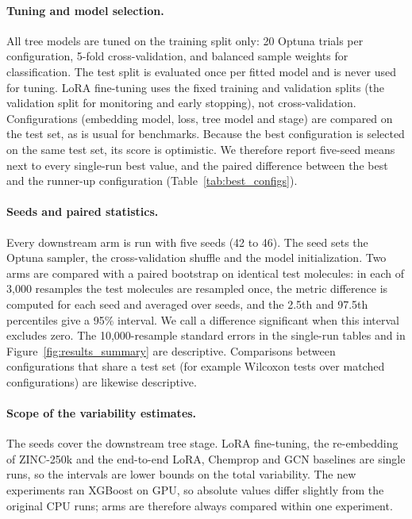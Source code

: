 \documentclass[pdflatex,sn-basic]{sn-jnl}%
\begin{document}
\paragraph{Tuning and model selection.} All tree models are tuned on the training split only: 20 Optuna trials per configuration, 5-fold cross-validation, and balanced sample weights for classification. The test split is evaluated once per fitted model and is never used for tuning. LoRA fine-tuning uses the fixed training and validation splits (the validation split for monitoring and early stopping), not cross-validation. Configurations (embedding model, loss, tree model and stage) are compared on the test set, as is usual for benchmarks. Because the best configuration is selected on the same test set, its score is optimistic. We therefore report five-seed means next to every single-run best value, and the paired difference between the best and the runner-up configuration (Table~\ref{tab:best_configs}).

\paragraph{Seeds and paired statistics.} Every downstream arm is run with five seeds (42 to 46). The seed sets the Optuna sampler, the cross-validation shuffle and the model initialization. Two arms are compared with a paired bootstrap on identical test molecules: in each of 3{,}000 resamples the test molecules are resampled once, the metric difference is computed for each seed and averaged over seeds, and the 2.5th and 97.5th percentiles give a 95\% interval. We call a difference significant when this interval excludes zero. The 10{,}000-resample standard errors in the single-run tables and in Figure~\ref{fig:results_summary} are descriptive. Comparisons between configurations that share a test set (for example Wilcoxon tests over matched configurations) are likewise descriptive.

\paragraph{Scope of the variability estimates.} The seeds cover the downstream tree stage. LoRA fine-tuning, the re-embedding of ZINC-250k and the end-to-end LoRA, Chemprop and GCN baselines are single runs, so the intervals are lower bounds on the total variability. The new experiments ran XGBoost on GPU, so absolute values differ slightly from the original CPU runs; arms are therefore always compared within one experiment.
\end{document}
